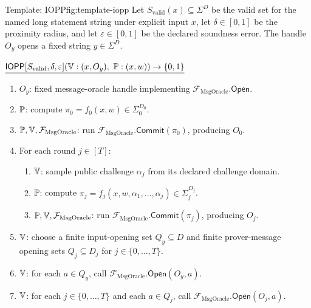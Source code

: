 \begin{protocolbox}{Template: IOPP}{fig:template-iopp}
Let \(S_{\mathrm{valid}}(x)\subseteq\Sigma^D\) be the valid set for the named
long statement string under explicit input \(x\), let \(\delta\in[0,1]\) be the proximity radius, and
let \(\varepsilon\in[0,1]\) be the declared soundness error.  The handle
\(O_y\) opens a fixed string \(y\in\Sigma^D\).

\smallskip
\noindent\(\underline{\mathsf{IOPP}[S_{\mathrm{valid}},\delta,\varepsilon](\verifier:(x,O_y),\ \prover:(x,w))\to\{0,1\}}\)

\smallskip
\begin{enumerate}[leftmargin=0.24in,label=\textbf{P\arabic*.},itemsep=0.08em,topsep=0.1em,parsep=0pt]
  \item \(O_y\): fixed message-oracle handle implementing
        \(\mathcal F_{\mathrm{MsgOracle}}.\mathsf{Open}\).
  \item \(\mathbb{P}\): compute
        \(\pi_0=f_0(x,w)\in\Sigma_0^{D_0}\).
  \item \(\mathbb{P},\mathbb{V},\mathcal F_{\mathrm{MsgOracle}}\): run
        \(\mathcal F_{\mathrm{MsgOracle}}.\mathsf{Commit}(\pi_0)\),
        producing \(O_0\).
  \item For each round \(j\in[T]\):
        \begin{enumerate}[leftmargin=0.2in,label=\textbf{P\arabic{enumi}.\arabic*.},itemsep=0.05em,topsep=0.05em,parsep=0pt]
          \item \(\mathbb{V}\): sample public challenge \(\alpha_j\) from its
                declared challenge domain.
          \item \(\mathbb{P}\): compute
                \(\pi_j=f_j(x,w,\alpha_1,\ldots,\alpha_j)\in\Sigma_j^{D_j}\).
          \item \(\mathbb{P},\mathbb{V},\mathcal F_{\mathrm{MsgOracle}}\): run
                \(\mathcal F_{\mathrm{MsgOracle}}.\mathsf{Commit}(\pi_j)\),
                producing \(O_j\).
        \end{enumerate}
  \item \(\mathbb{V}\): choose a finite input-opening set \(Q_y\subseteq D\) and
        finite prover-message opening sets \(Q_j\subseteq D_j\) for
        \(j\in\{0,\ldots,T\}\).
  \item \(\mathbb{V}\): for each \(a\in Q_y\), call
        \(\mathcal F_{\mathrm{MsgOracle}}.\mathsf{Open}(O_y,a)\).
  \item \(\mathbb{V}\): for each \(j\in\{0,\ldots,T\}\) and each
        \(a\in Q_j\), call
        \(\mathcal F_{\mathrm{MsgOracle}}.\mathsf{Open}(O_j,a)\).

\end{enumerate}
\end{protocolbox}
